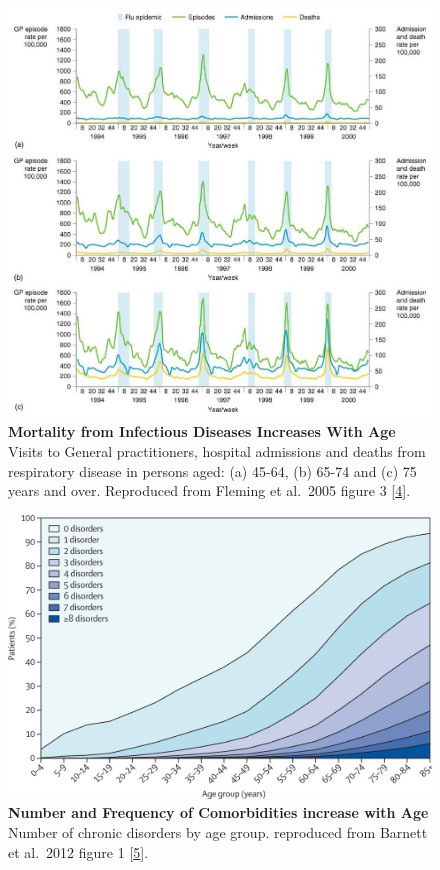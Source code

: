 \documentclass[
]{book}
\begin{document}
\begin{figure}

{\centering \includegraphics[width=0.9\linewidth]{figs/Fleming2005_fig3} 

}

\caption{\textbf{Mortality from Infectious Diseases Increases With Age} Visits to General practitioners, hospital admissions and deaths from respiratory disease in persons aged: (a) 45-64, (b) 65-74 and (c) 75 years and over. Reproduced from Fleming et al.~2005 figure 3 {[}\protect\hyperlink{ref-Fleming2005}{4}{]}.}\label{fig:Fleming2005-fig3}
\end{figure}



\begin{figure}

{\centering \includegraphics[width=0.8\linewidth]{figs/Barnett2012_fig1} 

}

\caption{\textbf{Number and Frequency of Comorbidities increase with Age} Number of chronic disorders by age group. reproduced from Barnett et al.~2012 figure 1 {[}\protect\hyperlink{ref-Barnett2012}{5}{]}.}\label{fig:Barnett2012-fig1}
\end{figure}
\end{document}
